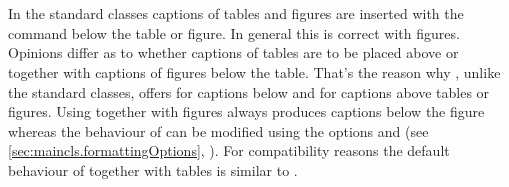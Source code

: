 \begin{Declaration}
  \\
  \\
\end{Declaration}%
%
%
%
In the standard classes captions of tables and figures are inserted
with the  command below the table or figure. In general
this is correct with figures. Opinions differ as to whether captions
of tables are to be placed above or together with captions of
figures below the table. That's the reason why \KOMAScript{}, unlike the standard
classes, offers  for captions below and
 for captions above tables or figures. Using
 together with figures always produces captions below
the figure whereas the behaviour of  can be
modified using the options
 and
 (see
\autoref{sec:maincls.formattingOptions},
). For compatibility
reasons the default behaviour of  together with tables
is similar to .
%
